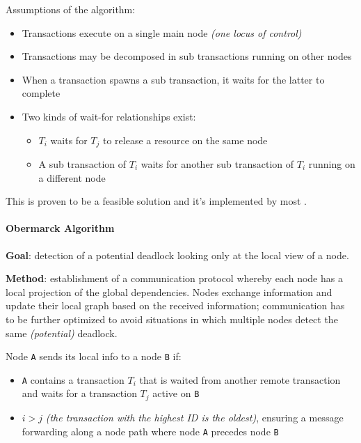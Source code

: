 \documentclass[english]{article}
\begin{document}
Assumptions of the algorithm:

\begin{itemize}
  \item Transactions execute on a single main node \textit{(one locus of control)}
  \item Transactions may be decomposed in sub transactions running on other nodes
  \item When a transaction spawns a sub transaction, it waits for the latter to complete
  \item Two kinds of wait-for relationships exist:
        \begin{itemize}
          \item \(T_i\) waits for \(T_j\) to release a resource on the same node
          \item A sub transaction of \(T_i\) waits for another sub transaction of \(T_i\) running on a different node
        \end{itemize}
\end{itemize}

\bigskip
This is proven to be a feasible solution and it's implemented by most \DBMS.

\paragraph{Obermarck Algorithm}

\textbf{Goal}:
detection of a potential deadlock looking only at the local view of a node.

\textbf{Method}:
establishment of a communication protocol whereby each node has a local projection of the global dependencies.
Nodes exchange information and update their local graph based on the received information;
communication has to be further optimized to avoid situations in which multiple nodes detect the same \textit{(potential)} deadlock.

\bigskip
Node \texttt{A} sends its local info to a node \texttt{B} if:

\begin{itemize}
  \item \texttt{A} contains a transaction \(T_i\) that is waited from another remote transaction and waits for a transaction \(T_j\) active on \texttt{B}
  \item \(i > j\) \textit{(the transaction with the highest ID is the oldest)}, ensuring a message forwarding along a node path where node \texttt{A} precedes node \texttt{B}
\end{itemize}
\end{document}
